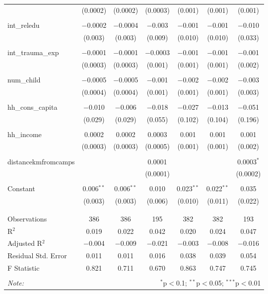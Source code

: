 \begin{table}[H]
\begin{tabular}{@{\extracolsep{4pt}}lcccccc}
  & (0.0002) & (0.0002) & (0.0003) & (0.001) & (0.001) & (0.001) \\ 
  & & & & & & \\ 
 int\_reledu & $-$0.0002 & $-$0.0004 & $-$0.003 & $-$0.001 & $-$0.001 & $-$0.010 \\ 
  & (0.003) & (0.003) & (0.009) & (0.010) & (0.010) & (0.033) \\ 
  & & & & & & \\ 
 int\_trauma\_exp & $-$0.0001 & $-$0.0001 & $-$0.0003 & $-$0.001 & $-$0.001 & $-$0.001 \\ 
  & (0.0003) & (0.0003) & (0.001) & (0.001) & (0.001) & (0.002) \\ 
  & & & & & & \\ 
 num\_child & $-$0.0005 & $-$0.0005 & $-$0.001 & $-$0.002 & $-$0.002 & $-$0.003 \\ 
  & (0.0004) & (0.0004) & (0.001) & (0.001) & (0.001) & (0.003) \\ 
  & & & & & & \\ 
 hh\_cons\_capita & $-$0.010 & $-$0.006 & $-$0.018 & $-$0.027 & $-$0.013 & $-$0.051 \\ 
  & (0.029) & (0.029) & (0.055) & (0.102) & (0.104) & (0.196) \\ 
  & & & & & & \\ 
 hh\_income & 0.0002 & 0.0002 & 0.0003 & 0.001 & 0.001 & 0.001 \\ 
  & (0.0003) & (0.0003) & (0.0005) & (0.001) & (0.001) & (0.002) \\ 
  & & & & & & \\ 
 distancekmfromcamps &  &  & 0.0001 &  &  & 0.0003$^{*}$ \\ 
  &  &  & (0.0001) &  &  & (0.0002) \\ 
  & & & & & & \\ 
 Constant & 0.006$^{**}$ & 0.006$^{**}$ & 0.010 & 0.023$^{**}$ & 0.022$^{**}$ & 0.035 \\ 
  & (0.003) & (0.003) & (0.006) & (0.010) & (0.011) & (0.022) \\ 
  & & & & & & \\ 
\hline \\[-1.8ex] 
Observations & 386 & 386 & 195 & 382 & 382 & 193 \\ 
R$^{2}$ & 0.019 & 0.022 & 0.042 & 0.020 & 0.024 & 0.047 \\ 
Adjusted R$^{2}$ & $-$0.004 & $-$0.009 & $-$0.021 & $-$0.003 & $-$0.008 & $-$0.016 \\ 
Residual Std. Error & 0.011 & 0.011 & 0.016 & 0.038 & 0.039 & 0.054 \\ 
F Statistic & 0.821 & 0.711 & 0.670 & 0.863 & 0.747 & 0.745 \\ 
\hline 
\hline \\[-1.8ex] 
\textit{Note:}  & \multicolumn{6}{r}{$^{*}$p$<$0.1; $^{**}$p$<$0.05; $^{***}$p$<$0.01} \\ 
\end{tabular} 
\end{table} 
